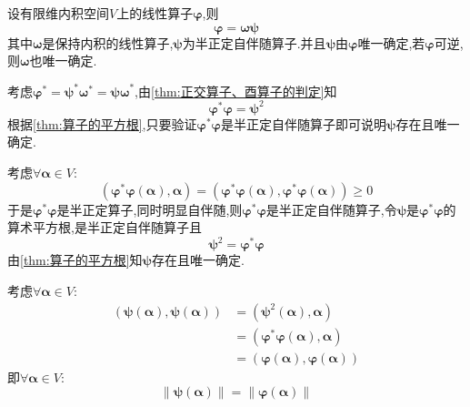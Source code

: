 \begin{formal}
    \begin{theorem}[极分解定理]\label{thm:极分解定理}
        设有限维内积空间$V$上的线性算子$\bm{\varphi}$,则\[
        \bm{\varphi}=\bm{\omega\psi}
        \]其中$\bm{\omega}$是保持内积的线性算子,$\bm{\psi}$为半正定自伴随算子.并且$\bm{\psi}$由$\bm{\varphi}$唯一确定,若$\bm{\varphi}$可逆,则$\bm{\omega}$也唯一确定.
    \end{theorem}
    \begin{Proof}
        考虑$\bm{\varphi}^*=\bm{\psi}^*\bm{\omega}^*=\bm{\psi\omega}^*$,由\cref{thm:正交算子、酉算子的判定}知\[
        \bm{\varphi}^*\bm{\varphi}=\bm{\psi}^2
        \]根据\cref{thm:算子的平方根},只要验证$\bm{\varphi}^*\bm{\varphi}$是半正定自伴随算子即可说明$\bm{\psi}$存在且唯一确定.

        考虑$\forall\bm{\alpha}\in V:$\[
        \left(
            \bm{\varphi}^*\bm{\varphi}\left(\bm{\alpha}\right),\bm{\alpha}
        \right)=\left(
            \bm{\varphi}^*\bm{\varphi}\left(\bm{\alpha}\right),\bm{\varphi}^*\bm{\varphi}\left(\bm{\alpha}\right)
        \right)\geqslant 0
        \]于是$\bm{\varphi}^*\bm{\varphi}$是半正定算子,同时明显自伴随,则$\bm{\varphi}^*\bm{\varphi}$是半正定自伴随算子,令$\bm{\psi}$是$\bm{\varphi}^*\bm{\varphi}$的算术平方根,是半正定自伴随算子且\[
        \bm{\psi}^2=\bm{\varphi}^*\bm{\varphi}
        \]
        由\cref{thm:算子的平方根}知$\bm{\psi}$存在且唯一确定.

        考虑$\forall\bm{\alpha}\in V:$\begin{align*}
            \left(
                \bm{\psi}\left(
                    \bm{\alpha}
                \right),\bm{\psi}\left(
                    \bm{\alpha}
                    \right)
            \right)&=\left(
                \bm{\psi}^2\left(
                    \bm{\alpha}
                \right),\bm{\alpha}
            \right)\\
            &=\left(
                \bm{\varphi}^*\bm{\varphi}\left(
                    \bm{\alpha}
                \right),\bm{\alpha}
            \right)\\
            &=\left(
                \bm{\varphi}\left(
                    \bm{\alpha}
                \right),\bm{\varphi}\left(
                    \bm{\alpha}
                \right)
            \right)
        \end{align*}即$\forall\bm{\alpha}\in V:$\[
        \left\lVert\bm{\psi}\left(
            \bm{\alpha}
        \right)\right\rVert=\left\lVert\bm{\varphi}\left(
            \bm{\alpha}
        \right)\right\rVert
        \]


\end{Proof}
\end{formal}
